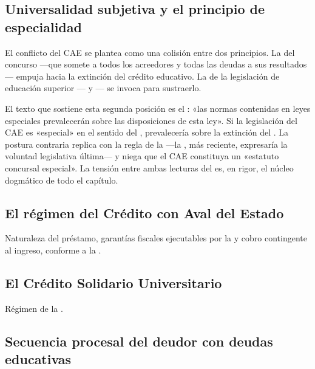 \subsection{Universalidad subjetiva y el principio de especialidad}

El conflicto del CAE se plantea como una colisión entre dos principios. La
 del concurso ---que somete a todos los acreedores y todas
las deudas a sus resultados--- empuja hacia la extinción del crédito educativo. La
 de la legislación de educación superior ---\Lcae{}
\citeyearpar{ley-20027} y \Lfondosolidario{} \citeyearpar{ley-19287}--- se invoca para
sustraerlo.

El texto que sostiene esta segunda posición es el : «las normas contenidas en leyes
especiales prevalecerán sobre las disposiciones de esta ley». Si la legislación del CAE es
«especial» en el sentido del , prevalecería sobre la extinción del . La postura
contraria replica con la regla de la  ---la \LIR{}, más reciente, expresaría
la voluntad legislativa última--- y niega que el CAE constituya un «estatuto concursal especial».
La tensión entre ambas lecturas del  es, en rigor, el núcleo dogmático de todo el
capítulo.

\subsection{El régimen del Crédito con Aval del Estado}

Naturaleza del préstamo, garantías fiscales ejecutables por la \tgr{} y cobro contingente
al ingreso, conforme a la \Lcae{}.

\subsection{El Crédito Solidario Universitario}

Régimen de la \Lfondosolidario{}.

\bloquePractico

\subsection{Secuencia procesal del deudor con deudas educativas}

